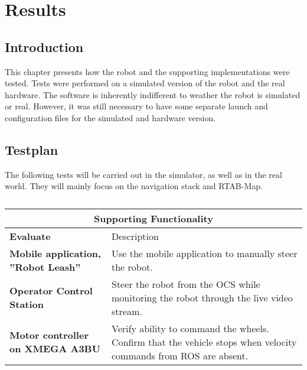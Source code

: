 \chapter{Results}
\label{chp:results} 

\section{Introduction}

This chapter presents how the robot and the supporting implementations were tested. Tests were performed on a simulated version of the robot and the real hardware. The software is inherently indifferent to weather the robot is simulated or real. However, it was still necessary to have some separate launch and configuration files for the simulated and hardware version. 

\section{Testplan}

The following tests will be carried out in the simulator, as well as in the real world. They will mainly focus on the navigation stack and \ac{RTAB-Map}. 

\begin{table}
	\centering
	\begin{tabular}{ p{3.5cm} | p{7cm} }
		\multicolumn{2}{c}{Supporting Functionality}\\
		\hline
		\textbf{Evaluate} & Description\\
		\hline
		\textbf{Mobile application, ''Robot Leash''} & Use the mobile application to manually steer the robot.\\
		\textbf{Operator Control Station} & Steer the robot from the \ac{OCS} while monitoring the robot through the live video stream. \\
		\hline
		\textbf{Motor controller on XMEGA A3BU} & Verify ability to command the wheels. Confirm that the vehicle stops when velocity commands from \ac{ROS} are absent.\\
		\hline
	\end{tabular}
	\caption{}
\end{table}

